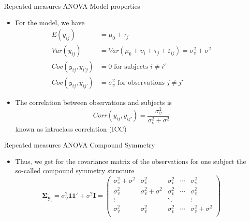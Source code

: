 \documentclass{beamer}
\newcommand{\vect}[1]{\mathbf{#1}}
\newcommand{\mat}[1]{\mathbf{#1}}
\newcommand{\gvect}[1]{\boldsymbol{#1}}
\begin{document}
\begin{frame}{Repeated measures ANOVA}
  {Model properties}
  \begin{itemize}
    \item For the model, we have
\begin{align*}
  E(y_{ij})   &= \mu_0 + \tau_j \\
  Var(y_{ij}) &= Var(\mu_0 + \upsilon_i + \tau_j + \varepsilon_{ij})
               = \sigma^2_\upsilon + \sigma^2 \\
  Cov(y_{ij}, y_{i'j}) &= 0 \text{ for subjects } i \neq i' \\
  Cov(y_{ij}, y_{ij'}) &= \sigma^2_\upsilon \text{ for observations }
                          j \neq j'
\end{align*}
      \vspace{-.6cm}
\item The correlation between observations and subjects is
\[
  Corr(y_{ij}, y_{ij'}) = \frac{\sigma^2_\upsilon}{\sigma^2_\upsilon +
    \sigma^2}
\]
known as intraclass correlation (ICC)
  \end{itemize}
\end{frame}

\begin{frame}{Repeated measures ANOVA}
{Compound Symmetry}
  \begin{itemize}
    \item Thus, we get for the covariance matrix of the observations for
      one subject the so-called compound symmetry structure
\[
  \gvect{\Sigma}_{\vect{y}_i} = \sigma^2_\upsilon \vect{1} \vect{1}'
    + \sigma^2 \mat{I}
  = 
  \begin{pmatrix}
    \sigma^2_\upsilon + \sigma^2 & \sigma^2_\upsilon & \sigma^2_\upsilon &
      \cdots & \sigma^2_\upsilon \\
    \sigma^2_\upsilon & \sigma^2_\upsilon  + \sigma^2 & \sigma^2_\upsilon &
      \cdots & \sigma^2_\upsilon \\
    \vdots & & \ddots & & \vdots \\
    \sigma^2_\upsilon & \sigma^2_\upsilon  & \sigma^2_\upsilon &
      \cdots & \sigma^2_\upsilon + \sigma^2 \\
  \end{pmatrix}
\]
  \end{itemize}
\end{frame}
\end{document}
